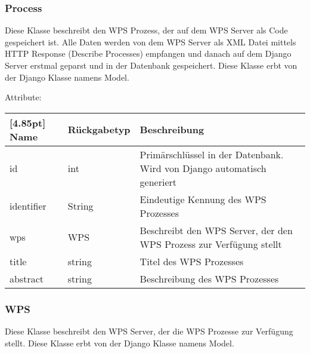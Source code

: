 		\subsubsection{Process}
			Diese Klasse beschreibt den WPS Prozess, der auf dem WPS Server als Code gespeichert ist. Alle Daten werden von dem WPS Server als XML Datei mittels HTTP Response (Describe Processes) empfangen und danach auf dem Django Server erstmal geparst und in der Datenbank gespeichert. \newline
			Diese Klasse erbt von der Django Klasse namens \glqq Model\grqq .
			
			Attribute:
			\begin{center}
				\setlength\tabcolsep{5pt}
				\renewcommand{\arraystretch}{1.5}
				
				\begin{tabularx}{\textwidth}{|l|l|X|}
					\hline
					\rowcolor[gray]{0.75}[4.85pt]
					Name & Rückgabetyp & Beschreibung \\ \hline 
					id & int & Primärschlüssel in der Datenbank. Wird von Django automatisch generiert \\ \hline
					identifier & String & Eindeutige Kennung des WPS Prozesses \\ \hline
					wps & WPS & Beschreibt den WPS Server, der den WPS Prozess zur Verfügung stellt   \\ \hline
					title & string & Titel des WPS Prozesses \\ \hline
					abstract & string & Beschreibung des WPS Prozesses\\
					\hline
				\end{tabularx}
			\end{center}
        \subsubsection{WPS}
			Diese Klasse beschreibt den WPS Server, der die WPS Prozesse zur Verfügung stellt. \newline
			Diese Klasse erbt von der Django Klasse namens \glqq Model\grqq .
			
